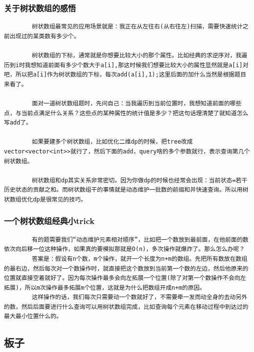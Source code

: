 \documentclass[10pt, a4paper, twocolumn]{article} %
\begin{document}
    \subsubsection{关于树状数组的感悟}
    \begin{lstlisting}
        树状数组最常见的应用场景就是：我正在从左往右(从右往左)扫描，需要快速统计之前出现过的某类数有多少个。

        树状数组的下标，通常就是你想要比较大小的那个属性。比如经典的求逆序对，我遍历到i时我想知道前面有多少个数大于a[i],那这时候我们想要比较大小的属性显然就是a[i]对吧，所以把a[i]作为树状数组的下标，每次add(a[i],1);这里后面的加什么当然是根据题目来看了。

        面对一道树状数组题时，先问自己：当我遍历到当前位置时，我想知道前面的哪些点，与当前点满足什么关系？这些点的某种属性的统计值是多少？把这句话理清楚了就知道怎么写add了。

        如果要建多个树状数组，比如优化二维dp的时候，把tree改成vector<vector<int>>就行了，然后下面的add，query啥的多个参数就行，表示查询第几个树状数组。

        树状数组和dp其实关系非常密切。因为你做dp的时候也经常会出现：当前状态=若干历史状态的贡献之和。而树状数组干的事情就是动态维护一批数的前缀和并快速查询。所以用树状数组优化dp是很常见的技巧。
    \end{lstlisting}
    \subsubsection{一个树状数组经典小trick}
    \begin{lstlisting}
        有的题需要我们“动态维护元素相对顺序”，比如把一个数放到最前面，在他前面的数依次向后移一位这种操作，如果真的要模拟那就是O(n)，多次操作就爆炸了。那么怎么办呢？
        答案是：假设有n个数，m个操作，就开一个长度为n+m的数组。先把所有数放在数组的最右边，然后每次对一个数操作时，就直接把这个数放到当前第一个数的左边，然后他原来的位置就直接空着就好了。因为每次操作最多会向左拓展一个位置(除了对第一个数操作不会向左拓展)，所以m次操作最多拓展m个位置，这就是为什么把数组开成n+m的原因。
        这样操作的话，我们每次只需要动一个数就好了，不需要牵一发而动全身的去动另外的数，然后后面要进行什么查询可以用树状数组完成，比如查询每个元素在移动过程中到达过的最大最小位置什么的。
    \end{lstlisting}
    \subsection{板子}
\end{document}
